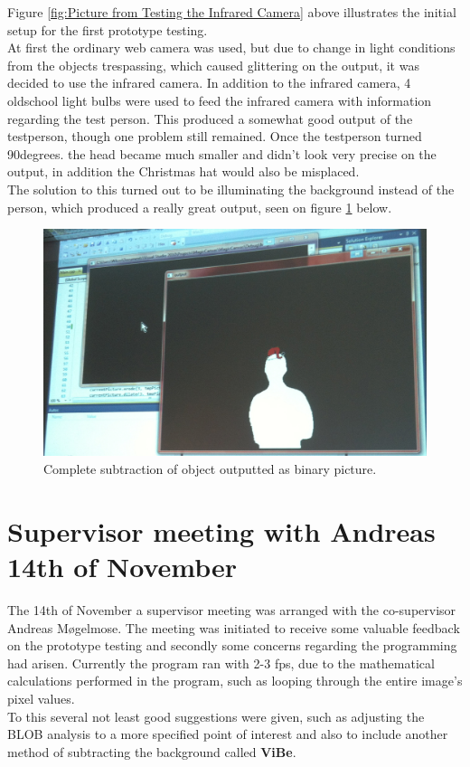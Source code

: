 Figure \ref{fig:Picture from Testing the Infrared Camera} above illustrates the initial setup for the first prototype testing. \\
At first the ordinary web camera was used, but due to change in light conditions from the objects trespassing, which caused glittering on the output, it was decided to use the infrared camera. In addition to the infrared camera, 4  oldschool light bulbs were used to  feed the infrared camera with information regarding the test person. This produced a somewhat good output of the testperson, though one problem still remained. Once the testperson turned 90degrees. the head became much smaller and didn't look very precise on the output, in addition the Christmas hat would also be misplaced.\\
The solution to this turned out to be illuminating the background instead of the person, which produced a really great output, seen on figure \ref{fig:max_subtracted} below.


\begin{figure}[htbp]
\centering
\includegraphics[width=1.00\textwidth]{Pictures/Test/MaxSubtracted.jpg}
\caption{Complete subtraction of object outputted as binary picture.}
\label{fig:max_subtracted}
\end{figure}


\section{Supervisor meeting with Andreas 14th of November}
The 14th of November a supervisor meeting was arranged with the co-supervisor Andreas Møgelmose. The meeting was initiated to receive some valuable feedback on the prototype testing and secondly some concerns regarding the programming had arisen. Currently the program ran with 2-3 fps, due to the mathematical calculations performed in the program, such as looping through the entire image's pixel values.\\
To this several not least good suggestions were given, such as adjusting the BLOB analysis to a more specified point of interest and also to include another method of subtracting the background called \textbf{ViBe}.

